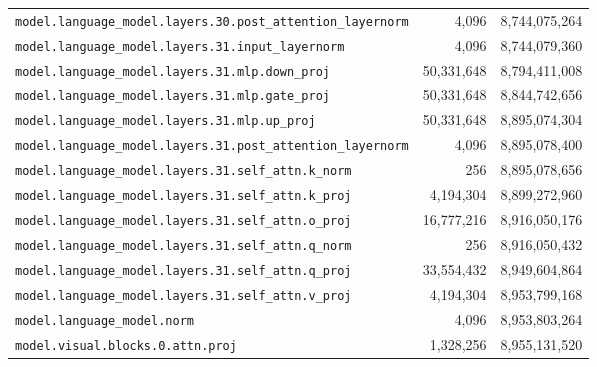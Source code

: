\documentclass[10pt,a4paper]{article}
\theoremstyle{definition}
\begin{document}
\begin{appendices}
\begin{longtable}{p{9.5cm}rr}
\texttt{model.\allowbreak{}language\_model.\allowbreak{}layers.\allowbreak{}30.\allowbreak{}post\_attention\_layernorm} & 4,096 & 8,744,075,264 \\
\texttt{model.\allowbreak{}language\_model.\allowbreak{}layers.\allowbreak{}31.\allowbreak{}input\_layernorm} & 4,096 & 8,744,079,360 \\
\texttt{model.\allowbreak{}language\_model.\allowbreak{}layers.\allowbreak{}31.\allowbreak{}mlp.\allowbreak{}down\_proj} & 50,331,648 & 8,794,411,008 \\
\texttt{model.\allowbreak{}language\_model.\allowbreak{}layers.\allowbreak{}31.\allowbreak{}mlp.\allowbreak{}gate\_proj} & 50,331,648 & 8,844,742,656 \\
\texttt{model.\allowbreak{}language\_model.\allowbreak{}layers.\allowbreak{}31.\allowbreak{}mlp.\allowbreak{}up\_proj} & 50,331,648 & 8,895,074,304 \\
\texttt{model.\allowbreak{}language\_model.\allowbreak{}layers.\allowbreak{}31.\allowbreak{}post\_attention\_layernorm} & 4,096 & 8,895,078,400 \\
\texttt{model.\allowbreak{}language\_model.\allowbreak{}layers.\allowbreak{}31.\allowbreak{}self\_attn.\allowbreak{}k\_norm} & 256 & 8,895,078,656 \\
\texttt{model.\allowbreak{}language\_model.\allowbreak{}layers.\allowbreak{}31.\allowbreak{}self\_attn.\allowbreak{}k\_proj} & 4,194,304 & 8,899,272,960 \\
\texttt{model.\allowbreak{}language\_model.\allowbreak{}layers.\allowbreak{}31.\allowbreak{}self\_attn.\allowbreak{}o\_proj} & 16,777,216 & 8,916,050,176 \\
\texttt{model.\allowbreak{}language\_model.\allowbreak{}layers.\allowbreak{}31.\allowbreak{}self\_attn.\allowbreak{}q\_norm} & 256 & 8,916,050,432 \\
\texttt{model.\allowbreak{}language\_model.\allowbreak{}layers.\allowbreak{}31.\allowbreak{}self\_attn.\allowbreak{}q\_proj} & 33,554,432 & 8,949,604,864 \\
\texttt{model.\allowbreak{}language\_model.\allowbreak{}layers.\allowbreak{}31.\allowbreak{}self\_attn.\allowbreak{}v\_proj} & 4,194,304 & 8,953,799,168 \\
\texttt{model.\allowbreak{}language\_model.\allowbreak{}norm} & 4,096 & 8,953,803,264 \\
\texttt{model.\allowbreak{}visual.\allowbreak{}blocks.\allowbreak{}0.\allowbreak{}attn.\allowbreak{}proj} & 1,328,256 & 8,955,131,520 \\

\end{longtable}
\end{appendices}
\end{document}
